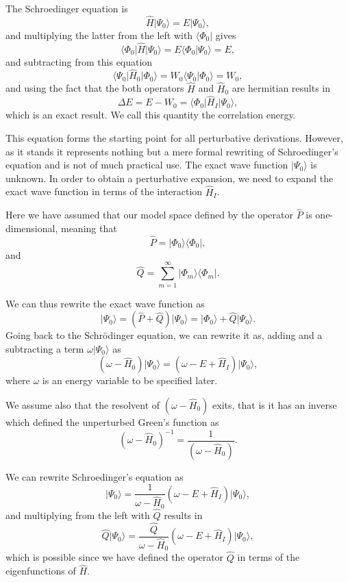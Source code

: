 \documentclass[%
twoside,                 %
final,                   %
10pt]{article}
\begin{document}
The Schroedinger equation is
\[
\hat{H}\vert \Psi_0\rangle = E\vert \Psi_0\rangle,
\]
and multiplying the latter from the left with $\langle \Phi_0\vert $ gives
\[
\langle \Phi_0\vert \hat{H}\vert \Psi_0\rangle = E\langle \Phi_0\vert \Psi_0\rangle=E,
\]
and subtracting from this equation
\[
\langle \Psi_0\vert \hat{H}_0\vert \Phi_0\rangle= W_0\langle \Psi_0\vert \Phi_0\rangle=W_0,
\]
and using the fact that the both operators $\hat{H}$ and $\hat{H}_0$ are hermitian 
results in
\[
\Delta E=E-W_0=\langle \Phi_0\vert \hat{H}_I\vert \Psi_0\rangle,
\]
which is an exact result. We call this quantity the correlation energy.



This equation forms the starting point for all perturbative derivations. However,
as it stands it represents nothing but a mere formal rewriting of Schroedinger's equation and is not of much practical use. The exact wave function $\vert \Psi_0\rangle$ is unknown. In order to obtain a perturbative expansion, we need to expand the exact wave function in terms of the interaction $\hat{H}_I$. 

Here we have assumed that our model space defined by the operator $\hat{P}$ is one-dimensional, meaning that
\[
\hat{P}= \vert \Phi_0\rangle \langle \Phi_0\vert ,
\]
and
\[
\hat{Q}=\sum_{m=1}^{\infty}\vert \Phi_m\rangle \langle \Phi_m\vert .
\]


We can thus rewrite the exact wave function as
\[
\vert \Psi_0\rangle= (\hat{P}+\hat{Q})\vert \Psi_0\rangle=\vert \Phi_0\rangle+\hat{Q}\vert \Psi_0\rangle.
\]
Going back to the Schr\"odinger equation, we can rewrite it as, adding and a subtracting a term $\omega \vert \Psi_0\rangle$ as
\[
\left(\omega-\hat{H}_0\right)\vert \Psi_0\rangle=\left(\omega-E+\hat{H}_I\right)\vert \Psi_0\rangle,
\]
where $\omega$ is an energy variable to be specified later. 


We assume also that the resolvent of $\left(\omega-\hat{H}_0\right)$ exits, that is
it has an inverse which defined the unperturbed Green's function as
\[
\left(\omega-\hat{H}_0\right)^{-1}=\frac{1}{\left(\omega-\hat{H}_0\right)}.
\]

We can rewrite Schroedinger's equation as
\[
\vert \Psi_0\rangle=\frac{1}{\omega-\hat{H}_0}\left(\omega-E+\hat{H}_I\right)\vert \Psi_0\rangle,
\]
and multiplying from the left with $\hat{Q}$ results in
\[
\hat{Q}\vert \Psi_0\rangle=\frac{\hat{Q}}{\omega-\hat{H}_0}\left(\omega-E+\hat{H}_I\right)\vert \Psi_0\rangle,
\]
which is possible since we have defined the operator $\hat{Q}$ in terms of the eigenfunctions of $\hat{H}$.
\end{document}
